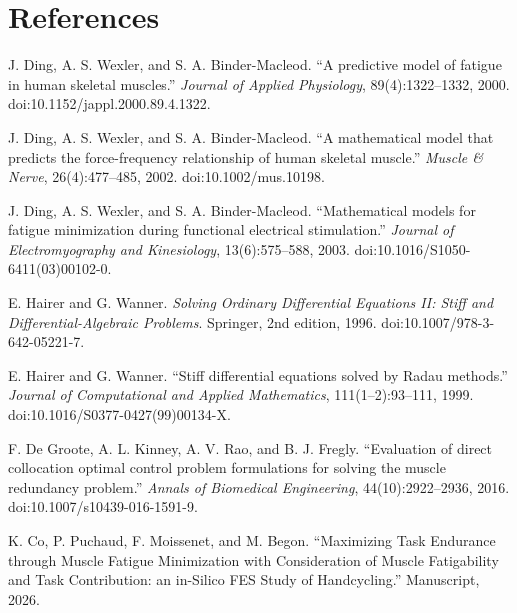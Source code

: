 \documentclass[10pt]{article}
\begin{document}
\section{References}
\begin{enumerate}[label={[\arabic*]},leftmargin=*]
\item J. Ding, A. S. Wexler, and S. A. Binder-Macleod. ``A predictive model of fatigue in human skeletal muscles.'' \emph{Journal of Applied Physiology}, 89(4):1322--1332, 2000. doi:10.1152/jappl.2000.89.4.1322.
\item J. Ding, A. S. Wexler, and S. A. Binder-Macleod. ``A mathematical model that predicts the force-frequency relationship of human skeletal muscle.'' \emph{Muscle \& Nerve}, 26(4):477--485, 2002. doi:10.1002/mus.10198.
\item J. Ding, A. S. Wexler, and S. A. Binder-Macleod. ``Mathematical models for fatigue minimization during functional electrical stimulation.'' \emph{Journal of Electromyography and Kinesiology}, 13(6):575--588, 2003. doi:10.1016/S1050-6411(03)00102-0.
\item E. Hairer and G. Wanner. \emph{Solving Ordinary Differential Equations II: Stiff and Differential-Algebraic Problems}. Springer, 2nd edition, 1996. doi:10.1007/978-3-642-05221-7.
\item E. Hairer and G. Wanner. ``Stiff differential equations solved by Radau methods.'' \emph{Journal of Computational and Applied Mathematics}, 111(1--2):93--111, 1999. doi:10.1016/S0377-0427(99)00134-X.
\item F. De Groote, A. L. Kinney, A. V. Rao, and B. J. Fregly. ``Evaluation of direct collocation optimal control problem formulations for solving the muscle redundancy problem.'' \emph{Annals of Biomedical Engineering}, 44(10):2922--2936, 2016. doi:10.1007/s10439-016-1591-9.
\item K. Co, P. Puchaud, F. Moissenet, and M. Begon. ``Maximizing Task Endurance through Muscle Fatigue Minimization with Consideration of Muscle Fatigability and Task Contribution: an in-Silico FES Study of Handcycling.'' Manuscript, 2026.
\end{enumerate}
\end{document}
